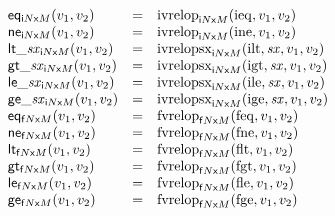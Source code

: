 $$
\begin{array}[t]{@{}lcl@{}l@{}}
{\mathsf{eq}}{{}_{{{\mathsf{i}}{N}}{\mathsf{x}}{M}}(v_1, v_2)} & = & {{\mathrm{ivrelop}}}_{{{\mathsf{i}}{N}}{\mathsf{x}}{M}}({\mathrm{ieq}}, v_1, v_2) \\
{\mathsf{ne}}{{}_{{{\mathsf{i}}{N}}{\mathsf{x}}{M}}(v_1, v_2)} & = & {{\mathrm{ivrelop}}}_{{{\mathsf{i}}{N}}{\mathsf{x}}{M}}({\mathrm{ine}}, v_1, v_2) \\
{{\mathsf{lt}}{\mathsf{\_}}{{\mathit{sx}}}}{{}_{{{\mathsf{i}}{N}}{\mathsf{x}}{M}}(v_1, v_2)} & = & {{\mathrm{ivrelopsx}}}_{{{\mathsf{i}}{N}}{\mathsf{x}}{M}}({\mathrm{ilt}}, {\mathit{sx}}, v_1, v_2) \\
{{\mathsf{gt}}{\mathsf{\_}}{{\mathit{sx}}}}{{}_{{{\mathsf{i}}{N}}{\mathsf{x}}{M}}(v_1, v_2)} & = & {{\mathrm{ivrelopsx}}}_{{{\mathsf{i}}{N}}{\mathsf{x}}{M}}({\mathrm{igt}}, {\mathit{sx}}, v_1, v_2) \\
{{\mathsf{le}}{\mathsf{\_}}{{\mathit{sx}}}}{{}_{{{\mathsf{i}}{N}}{\mathsf{x}}{M}}(v_1, v_2)} & = & {{\mathrm{ivrelopsx}}}_{{{\mathsf{i}}{N}}{\mathsf{x}}{M}}({\mathrm{ile}}, {\mathit{sx}}, v_1, v_2) \\
{{\mathsf{ge}}{\mathsf{\_}}{{\mathit{sx}}}}{{}_{{{\mathsf{i}}{N}}{\mathsf{x}}{M}}(v_1, v_2)} & = & {{\mathrm{ivrelopsx}}}_{{{\mathsf{i}}{N}}{\mathsf{x}}{M}}({\mathrm{ige}}, {\mathit{sx}}, v_1, v_2) \\
{\mathsf{eq}}{{}_{{{\mathsf{f}}{N}}{\mathsf{x}}{M}}(v_1, v_2)} & = & {{\mathrm{fvrelop}}}_{{{\mathsf{f}}{N}}{\mathsf{x}}{M}}({\mathrm{feq}}, v_1, v_2) \\
{\mathsf{ne}}{{}_{{{\mathsf{f}}{N}}{\mathsf{x}}{M}}(v_1, v_2)} & = & {{\mathrm{fvrelop}}}_{{{\mathsf{f}}{N}}{\mathsf{x}}{M}}({\mathrm{fne}}, v_1, v_2) \\
{\mathsf{lt}}{{}_{{{\mathsf{f}}{N}}{\mathsf{x}}{M}}(v_1, v_2)} & = & {{\mathrm{fvrelop}}}_{{{\mathsf{f}}{N}}{\mathsf{x}}{M}}({\mathrm{flt}}, v_1, v_2) \\
{\mathsf{gt}}{{}_{{{\mathsf{f}}{N}}{\mathsf{x}}{M}}(v_1, v_2)} & = & {{\mathrm{fvrelop}}}_{{{\mathsf{f}}{N}}{\mathsf{x}}{M}}({\mathrm{fgt}}, v_1, v_2) \\
{\mathsf{le}}{{}_{{{\mathsf{f}}{N}}{\mathsf{x}}{M}}(v_1, v_2)} & = & {{\mathrm{fvrelop}}}_{{{\mathsf{f}}{N}}{\mathsf{x}}{M}}({\mathrm{fle}}, v_1, v_2) \\
{\mathsf{ge}}{{}_{{{\mathsf{f}}{N}}{\mathsf{x}}{M}}(v_1, v_2)} & = & {{\mathrm{fvrelop}}}_{{{\mathsf{f}}{N}}{\mathsf{x}}{M}}({\mathrm{fge}}, v_1, v_2) \\
\end{array}
$$

